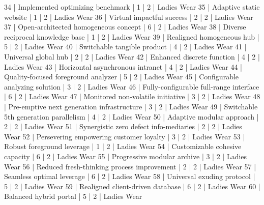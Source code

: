 \begin{enumerate}
\begin{pseudo*}
      34 | Implemented optimizing benchmark                 |        1 |      2 | Ladies Wear   
      35 | Adaptive static website                          |        1 |      2 | Ladies Wear   
      36 | Virtual impactful success                        |        2 |      2 | Ladies Wear   
      37 | Open-architected homogeneous concept             |        6 |      2 | Ladies Wear   
      38 | Diverse reciprocal knowledge base                |        1 |      2 | Ladies Wear   
      39 | Realigned homogeneous hub                        |        5 |      2 | Ladies Wear   
      40 | Switchable tangible product                      |        4 |      2 | Ladies Wear   
      41 | Universal global hub                             |        2 |      2 | Ladies Wear   
      42 | Enhanced discrete function                       |        4 |      2 | Ladies Wear   
      43 | Horizontal asynchronous intranet                 |        4 |      2 | Ladies Wear   
      44 | Quality-focused foreground analyzer              |        5 |      2 | Ladies Wear   
      45 | Configurable analyzing solution                  |        3 |      2 | Ladies Wear   
      46 | Fully-configurable full-range interface          |        6 |      2 | Ladies Wear   
      47 | Monitored non-volatile initiative                |        3 |      2 | Ladies Wear   
      48 | Pre-emptive next generation infrastructure       |        3 |      2 | Ladies Wear   
      49 | Switchable 5th generation parallelism            |        4 |      2 | Ladies Wear   
      50 | Adaptive modular approach                        |        2 |      2 | Ladies Wear   
      51 | Synergistic zero defect info-mediaries           |        2 |      2 | Ladies Wear   
      52 | Persevering empowering customer loyalty          |        3 |      2 | Ladies Wear   
      53 | Robust foreground leverage                       |        1 |      2 | Ladies Wear   
      54 | Customizable cohesive capacity                   |        6 |      2 | Ladies Wear   
      55 | Progressive modular archive                      |        3 |      2 | Ladies Wear   
      56 | Reduced fresh-thinking process improvement       |        2 |      2 | Ladies Wear   
      57 | Seamless optimal leverage                        |        6 |      2 | Ladies Wear   
      58 | Universal exuding protocol                       |        5 |      2 | Ladies Wear   
      59 | Realigned client-driven database                 |        6 |      2 | Ladies Wear   
      60 | Balanced hybrid portal                           |        5 |      2 | Ladies Wear   

\end{pseudo*}
\end{enumerate}
